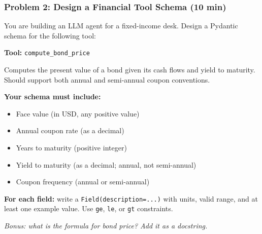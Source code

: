 \documentclass[9pt,t]{beamer}
\begin{document}
\begin{frame}[fragile]
\frametitle{Problem 2: Design a Financial Tool Schema (10 min)}

You are building an LLM agent for a fixed-income desk. Design a Pydantic schema
for the following tool:

\medskip
\textbf{Tool:} \texttt{compute\_bond\_price}

Computes the present value of a bond given its cash flows and yield to maturity.
Should support both annual and semi-annual coupon conventions.

\medskip
\textbf{Your schema must include:}
\begin{itemize}
  \item Face value (in USD, any positive value)
  \item Annual coupon rate (as a decimal)
  \item Years to maturity (positive integer)
  \item Yield to maturity (as a decimal; annual, not semi-annual)
  \item Coupon frequency (annual or semi-annual)
\end{itemize}

\medskip
\textbf{For each field:} write a \texttt{Field(description=...)} with units, valid range,
and at least one example value. Use \texttt{ge}, \texttt{le}, or \texttt{gt} constraints.

\medskip
\textit{Bonus: what is the formula for bond price? Add it as a docstring.}
\end{frame}
\end{document}
